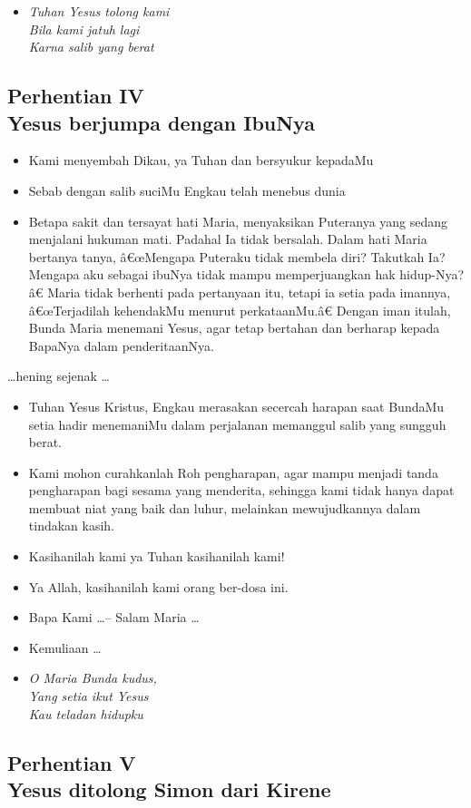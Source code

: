 \documentclass[a5paper,headsepline,titlepage,10pt,nnormalheadings,DIVcalc]{scrbook}
\newcommand{\BU}[1]{\begin{itemize} \item[U:] #1 \end{itemize}}
\newcommand{\BP}[1]{\begin{itemize} \item[P:] #1 \end{itemize}}
\newcommand{\BL}[1]{\begin{itemize} \item[L:] #1 \end{itemize}}
\begin{document}
\begin{itemize}
\item[4.] \it{Tuhan Yesus tolong kami
\\Bila kami jatuh lagi\\
Karna salib yang berat}
\end{itemize}

\subsection*{Perhentian IV
\\Yesus berjumpa dengan IbuNya}

\BP{Kami menyembah Dikau, ya Tuhan dan bersyukur kepadaMu}
\BU{Sebab dengan salib suciMu Engkau telah menebus dunia}
\BL{Betapa sakit dan tersayat hati Maria, menyaksikan Puteranya yang sedang menjalani hukuman mati. Padahal Ia tidak bersalah. Dalam hati Maria bertanya tanya, â€œMengapa Puteraku tidak membela diri? Takutkah Ia? Mengapa aku sebagai ibuNya tidak mampu memperjuangkan hak hidup-Nya?â€ Maria tidak berhenti pada pertanyaan itu, tetapi ia setia pada imannya, â€œTerjadilah kehendakMu menurut perkataanMu.â€ Dengan iman itulah, Bunda Maria menemani Yesus, agar tetap bertahan dan berharap kepada BapaNya dalam penderitaanNya.}

\begin{center}\dots hening sejenak \dots\end{center}

\BP{Tuhan Yesus Kristus, Engkau merasakan secercah harapan saat BundaMu setia hadir menemaniMu dalam perjalanan memanggul salib yang sungguh berat.}
\BU{Kami mohon curahkanlah Roh pengharapan, agar mampu menjadi tanda pengharapan bagi sesama yang menderita, sehingga kami tidak hanya dapat membuat niat yang baik dan luhur, melainkan mewujudkannya dalam tindakan kasih.}
\BP{Kasihanilah kami ya Tuhan kasihanilah kami!}
\BU{Ya Allah, kasihanilah kami orang ber-dosa ini.}
\BP{Bapa Kami \dots -- Salam Maria \dots}
\BP{Kemuliaan \dots}

\begin{itemize}
\item[2.] \it{O Maria Bunda kudus,
\\Yang setia ikut Yesus\\
Kau teladan hidupku}
\end{itemize}

\subsection*{Perhentian V
\\Yesus ditolong Simon dari Kirene}
\end{document}
